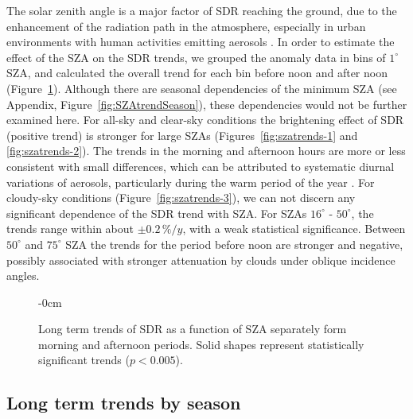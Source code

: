 \documentclass[applsci,article,submit,moreauthors,pdftex]{Definitions/mdpi}
\begin{document}
The solar zenith angle is a major factor of SDR reaching the ground, due
to the enhancement of the radiation path in the atmosphere, especially
in urban environments with human activities emitting aerosols
\citep{Wang2021}. In order to estimate the effect of the SZA on the SDR
trends, we grouped the anomaly data in bins of \(1^\circ\) SZA, and
calculated the overall trend for each bin before noon and after noon
(Figure~\ref{fig:szatrends}). Although there are seasonal dependencies
of the minimum SZA (see Appendix, Figure~\ref{fig:SZAtrendSeason}),
these dependencies would not be further examined here. For all-sky and
clear-sky conditions the brightening effect of SDR (positive trend) is
stronger for large SZAs (Figures~\ref{fig:szatrends-1} and
\ref{fig:szatrends-2}). The trends in the morning and afternoon hours
are more or less consistent with small differences, which can be
attributed to systematic diurnal variations of aerosols, particularly
during the warm period of the year \citep{Wang2021}. For cloudy-sky
conditions (Figure~\ref{fig:szatrends-3}), we can not discern any
significant dependence of the SDR trend with SZA. For SZAs \(16^\circ\)
- \(50^\circ\), the trends range within about \(\pm 0.2\,\%/y\), with a
weak statistical significance. Between \(50^\circ\) and \(75^\circ\) SZA
the trends for the period before noon are stronger and negative,
possibly associated with stronger attenuation by clouds under oblique
incidence angles.

\begin{figure}[h!]
    \begin{adjustwidth}{-\extralength}{0cm}
        {\centering 
            \hfill
            \hfill
        }
        \caption{Long term trends of SDR as a function of SZA separately form morning and afternoon periods. Solid shapes  represent statistically significant trends ($p < 0.005$).}\label{fig:szatrends}
    \end{adjustwidth}
\end{figure}

\hypertarget{long-term-trends-by-season}{%
\subsection{Long term trends by
season}\label{long-term-trends-by-season}}
\end{document}
